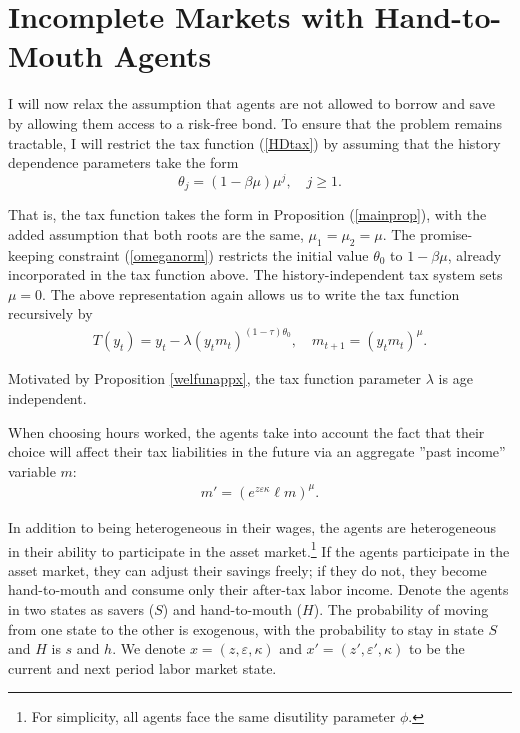 \section{Incomplete Markets with Hand-to-Mouth Agents}
I will now relax the assumption that agents are not allowed to borrow and save by allowing them access to a risk-free bond.  To ensure that the problem remains tractable, I will restrict the tax function (\ref{HDtax}) by assuming that the history dependence parameters take the form 
 \[
 \theta_j = (1-\beta \mu) \mu^{j}, \quad j\geq 1.
 \]

That is, the tax function takes the form in Proposition (\ref{mainprop}), with the added assumption that both roots are the same, $\mu_1=\mu_2=\mu$. 
The promise-keeping constraint (\ref{omeganorm}) restricts the initial value $\theta_0$ to $1-\beta\mu$, already incorporated in the tax function above. The history-independent tax system sets $\mu=0$. The above representation again allows us to write the tax function recursively by 
 \begin{align*}
T(y_t) = y_t  -\lambda \left(y_t  m_{t}  \right)^{(1-\tau) \theta_0}, \quad m_{t+1} = \left(y_t m_{t}\right)^{\mu}.
\end{align*}

Motivated by Proposition \ref{welfunappx}, the tax function parameter $\lambda$ is age independent.



When choosing hours worked, the agents take into account the fact that their choice  will affect their tax liabilities in the future via an aggregate ''past income'' variable $m$:
\begin{align}
m' =  \left(e^{z\varepsilon \kappa} \ell  m\right)^{\mu}. \label{A:lom}
\end{align}


In addition to being heterogeneous in their wages, the agents are heterogeneous in their ability to participate in the asset market.\footnote{For simplicity, all agents face the same disutility parameter $\phi$.}   If the agents participate in the asset market, they can adjust their savings freely; if they do not, they become hand-to-mouth and consume only their after-tax labor income. Denote the agents in two states as savers ($S$) and hand-to-mouth ($H$). The probability of moving from one state to the other is exogenous, with the probability to stay in state $S$ and $H$ is $s$ and $ h$. We denote $x=(z, \varepsilon, \kappa)$ and $x'=(z', \varepsilon', \kappa)$ to be the current and next period labor market state. 

